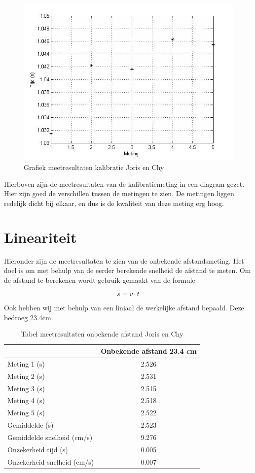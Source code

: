 \documentclass{report}
\begin{document}
\begin{figure}[H]
 \centering
\includegraphics[width=150mm] {grafiekmeetresultaten.jpg}
\caption{Grafiek meetresultaten kalibratie Joris en Chy}
\end{figure}
Hierboven zijn de meetresultaten van de kalibratiemeting in een diagram gezet. Hier zijn goed de verschillen tussen de metingen te zien. De metingen liggen redelijk dicht bij elkaar, en dus is de kwaliteit van deze meting erg hoog.

\section{Lineariteit}
Hieronder zijn de meetresultaten te zien van de onbekende afstandsmeting. Het doel is om met behulp van de eerder berekende snelheid de afstand te meten. Om de afstand te berekenen wordt gebruik gemaakt van de formule

\begin{equation}
s = v \cdot t
\end{equation}

Ook hebben wij met behulp van een liniaal de werkelijke afstand bepaald. Deze bedroeg 23.4cm.
\newline

\begin{table}
 \centering
\begin{tabular}{| l| c|}
\hline
    & Onbekende afstand 23.4 cm\\
\hline
   Meting 1 (s) & 2.526 \\
\hline
   Meting 2 (s) & 2.531 \\
\hline
   Meting 3 (s) & 2.515 \\
\hline
   Meting 4 (s) & 2.518 \\
\hline
   Meting 5 (s) & 2.522 \\
\hline
   Gemiddelde (s) & 2.523 \\
\hline
   Gemiddelde snelheid (cm/s) & 9.276 \\
\hline
   Onzekerheid tijd (s) & 0.005 \\
\hline
   Onzekerheid snelheid (cm/s) & 0.007 \\
\hline
 \end{tabular}
\caption{Tabel meetresultaten onbekende afstand Joris en Chy}
\end{table}
\end{document}
